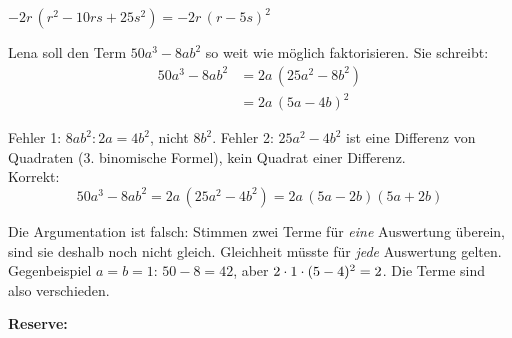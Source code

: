 \documentclass[11pt]{exam}
\begin{document}
\begin{questions}
{\begin{solution}
	$-2r\,(r^2-10rs+25s^2)=-2r\,(r-5s)^2$
\end{solution}}
{}


\newpage
\noaddpoints
\question[\totalpoints]
\addpoints
Lena soll den Term $50a^3-8ab^2$ so weit wie möglich faktorisieren. Sie schreibt:
\begin{align*}
	50a^3-8ab^2&=2a\,(25a^2-8b^2)\\
	&=2a\,(5a-4b)^2
\end{align*}
{\begin{solution}
	Fehler 1: $8ab^2:2a=4b^2$, nicht $8b^2$. Fehler 2: $25a^2-4b^2$ ist eine Differenz von Quadraten (3. binomische Formel), kein Quadrat einer Differenz.\\
	Korrekt:
	\[50a^3-8ab^2=2a\,(25a^2-4b^2)=2a\,(5a-2b)(5a+2b)\]
\end{solution}}
{}
{\begin{solution}
	Die Argumentation ist falsch: Stimmen zwei Terme für \emph{eine} Auswertung überein, sind sie deshalb noch nicht gleich. Gleichheit müsste für \emph{jede} Auswertung gelten. Gegenbeispiel $a=b=1$: $50-8=42$, aber $2\cdot1\cdot(5-4)^2=2$. Die Terme sind also verschieden.
\end{solution}}
{}

\newpage
{\bf Reserve:}


\end{questions}
\end{document}
